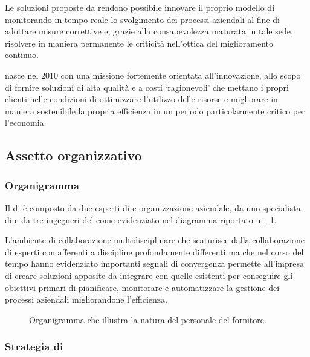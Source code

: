 Le soluzioni proposte da \team rendono possibile innovare il proprio modello di \bsn monitorando in tempo reale lo svolgimento dei processi aziendali al fine di adottare misure correttive  e, grazie alla consapevolezza maturata in tale sede, risolvere in maniera permanente le criticità nell'ottica del miglioramento continuo.

\team nasce nel 2010 con una missione fortemente orientata all'innovazione, allo scopo di fornire soluzioni \sw di alta qualità e a costi `ragionevoli' che mettano i propri clienti nelle condizioni di ottimizzare l'utilizzo delle risorse e migliorare in maniera sostenibile la propria efficienza in un periodo particolarmente critico per l'economia.

\subsection{Assetto organizzativo}

\subsubsection{Organigramma}
Il  di \team è composto da due esperti di \bsn {} e organizzazione aziendale, da uno specialista di  e da tre ingegneri del \sw come evidenziato nel diagramma riportato in \figurename~\ref{fig:organigram}.

L'ambiente di collaborazione multidisciplinare che scaturisce dalla collaborazione di esperti con  afferenti a discipline profondamente differenti ma che nel corso del tempo hanno evidenziato importanti segnali di convergenza permette all'impresa di creare soluzioni apposite da integrare con quelle esistenti per conseguire gli obiettivi primari di pianificare, monitorare e automatizzare la gestione dei processi aziendali migliorandone l'efficienza.

\begin{figure}[h]
\centering

\caption{Organigramma che illustra la natura del personale del fornitore.}
\label{fig:organigram}
\end{figure}

\subsubsection{Strategia di }

